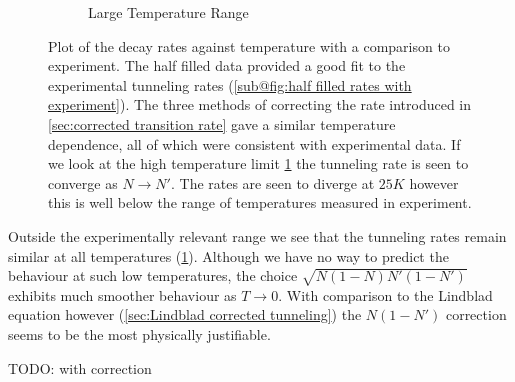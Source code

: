\begin{figure}[htbp]
\begin{subfigure}{0.45\linewidth}
        \caption{Large Temperature Range
        }\label{sub@fig:simulation temperature dependence comparison}
    \end{subfigure}
    \caption{Plot of the decay rates
        against temperature with a comparison
        to experiment. The half
        filled data provided a good
        fit to the experimental
        tunneling rates
        (\cref{sub@fig:half filled rates with experiment}).
        The three methods of correcting
        the rate introduced in
        \cref{sec:corrected transition rate}
        gave a similar temperature
        dependence, all of which were consistent
        with experimental
        data. If we look at
        the high temperature
        limit
        \cref{sub@fig:simulation temperature dependence comparison}
        the tunneling
        rate is seen to converge
        as \(N\rightarrow{}N'\).
        The rates are seen to diverge
        at \(25K\) however this is well
        below the range of temperatures
        measured in experiment.
    }\label{fig:simulation-experiment comparison}
\end{figure}

Outside the experimentally
relevant range we see that the
tunneling rates remain
similar at all temperatures
(\cref{sub@fig:simulation temperature dependence comparison}).
Although we have no way
to predict the behaviour at
such low temperatures, the
choice \(\sqrt{N(1-N)N'(1-N')}\)
exhibits much smoother
behaviour as \(T\rightarrow{}0\).
With comparison to the Lindblad
equation however
(\cref{sec:Lindblad corrected tunneling})
the \(N(1-N')\)
correction seems to be the
most physically justifiable.

TODO: with correction

